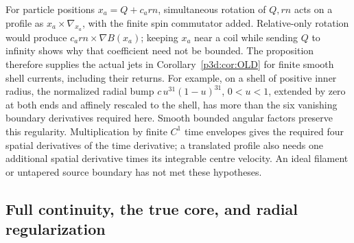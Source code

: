 \documentclass[11pt]{article}
\numberwithin{equation}{section}
\theoremstyle{definition}
\theoremstyle{remark}
\begin{document}
For particle positions $x_a=Q+c_a rn$, simultaneous rotation of $Q,rn$
acts on a profile as $x_a\times\nabla_{x_a}$, with the finite spin
commutator added. Relative-only rotation would produce
$c_a rn\times\nabla B(x_a)$; keeping $x_a$ near a coil while sending
$Q$ to infinity shows why that coefficient need not be bounded.
The proposition therefore supplies the actual jets in
Corollary~\ref{p3d:cor:OLD} for finite smooth shell currents, including
their returns. For example, on a shell of positive inner radius, the normalized
radial bump $c\,u^{31}(1-u)^{31}$, $0<u<1$, extended by zero
at both ends and affinely rescaled to the shell, has more than the
six vanishing boundary derivatives required here. Smooth bounded
angular factors preserve this regularity.
Multiplication by finite $C^1$ time envelopes gives the required four
spatial derivatives of the time derivative;
a translated profile also needs one additional spatial derivative times
its integrable centre velocity. An ideal filament or untapered source
boundary has not met these hypotheses.

\subsection{Full continuity, the true core, and radial regularization}
\end{document}
